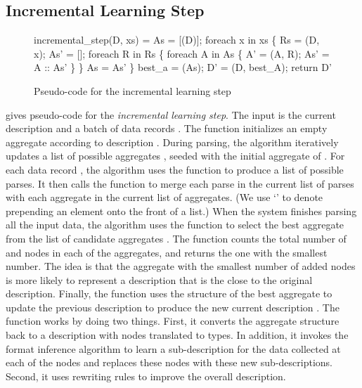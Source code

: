 
\subsection{Incremental Learning Step}
\begin{figure}[t]
\begin{codebox}
incremental_step(D, xs) =
  As = [(D)];
  foreach x in xs \{
    Rs = (D, x);
    As' = [];
    foreach R in Rs \{
      foreach A in As \{
        A' = (A, R); 
        As' = A :: As'
      \}
    \}
    As = As'
  \} 
  best_a = (As);
  D' = (D, best_A);  
  return D'
\end{codebox}
\caption{Pseudo-code for the incremental learning step}
\label{fig:inc-learning}
\end{figure}

 gives pseudo-code for the {\em incremental
  learning step}.  The input  is the current description
 and a batch of data records .  The 
function initializes an empty aggregate according to description
.  During parsing, the algorithm iteratively updates a list of
possible aggregates , seeded with the initial aggregate of
.  For each data record , the algorithm uses the
 function to produce a list  of possible parses.  It
then calls the  function to merge each parse  in
the current list of parses with each aggregate  in the current
list of aggregates.  (We use `\cd{::}' to denote prepending an element
onto the front of a list.)  When the system finishes parsing all the
input data, the algorithm uses the  function to
select the best aggregate from the list of candidate aggregates
.  The  function counts the total number of
 and  nodes in each of the aggregates, and returns
the one with the smallest number.
The idea is that the aggregate with the smallest number of added nodes is 
more likely to represent a description
that is the close to the original description. 
Finally, the  function uses the structure of the best
aggregate to update the previous description  to produce the new
current description .  The  function works by
doing two things.
First, it converts the aggregate structure back to a \pads{} description
with  nodes translated to  types. In addition,
it invokes the \learnpads{} format inference
algorithm to learn a sub-description for the data collected 
at each of the  nodes
and replaces these  nodes with these new sub-descriptions. 
Second, it uses rewriting
rules to improve the overall description.

